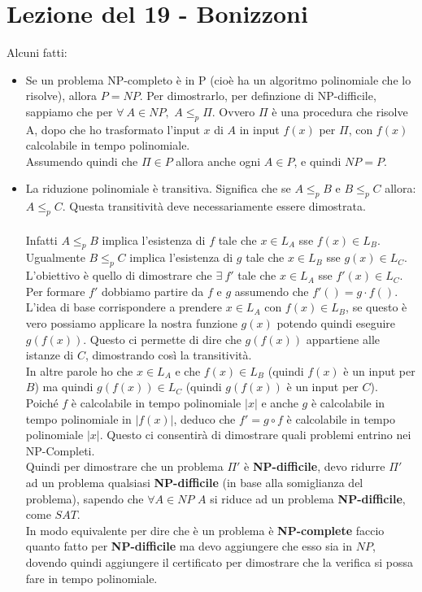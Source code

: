 \section{Lezione del 19 - Bonizzoni}
Alcuni fatti:
\begin{itemize}
    \item Se un problema NP-completo è in P (cioè ha un algoritmo polinomiale che lo risolve), allora $P = NP$.
    Per dimostrarlo, per definzione di NP-difficile, sappiamo che per $\forall \ A \in NP,\,\,A \leq_p \Pi$. Ovvero $\Pi$ è una procedura che risolve A, dopo che ho trasformato l'input $x$ di $A$ in input $f(x)$ per $\Pi$, con $f(x)$ calcolabile in tempo polinomiale.\\ Assumendo quindi che $\Pi\in P$ allora anche ogni $A\in P$, e quindi $NP=P$.
    \item La riduzione polinomiale è transitiva. Significa che se $A\leq_p B$ e $B\leq_p C$ allora: $A\leq_p C$. Questa transitività deve necessariamente essere dimostrata. \\ \\
    Infatti $A\leq_p B$ implica l'esistenza di $f$ tale che $x\in L_A$ sse $f(x) \in L_B$. Ugualmente $B\leq_p C$ implica l'esistenza di $g$ tale che $x\in L_B$ sse $g(x) \in L_C$.\\
    L'obiettivo è quello di dimostrare che $\exists \ f'$ tale che $x\in L_A$ sse $f'(x)\in  L_C$. Per formare $f'$ dobbiamo partire da $f$ e $g$ assumendo che $f'() = g \cdot f()$. L'idea di base corrispondere a prendere $x \in L_A$ con $f(x) \in L_B$, se questo è vero possiamo applicare la nostra funzione $g(x)$ potendo quindi eseguire $g(f(x))$. Questo ci permette di dire che $g(f(x))$ appartiene alle istanze di $C$, dimostrando così la transitività. \\
    In altre parole ho che $x \in L_A$ e che $f(x)\in L_B$ (quindi $f(x)$ è un input per $B$) ma quindi $g(f(x))\in L_C$ (quindi $g(f(x))$ è un input per $C$). \\
    Poiché $f$ è calcolabile in tempo polinomiale $|x|$ e anche $g$ è calcolabile in tempo polinomiale in $|f(x)|$, deduco che $f'=g\circ f$ è calcolabile in tempo polinomiale $|x|$. Questo ci consentirà di dimostrare quali problemi entrino nei NP-Completi. \\
    
    Quindi per dimostrare che un problema $\Pi'$ è \textbf{NP-difficile}, devo ridurre $\Pi'$ ad un problema qualsiasi \textbf{NP-difficile} (in base alla somiglianza del problema), sapendo che $\forall A\in NP$ $A$ si riduce ad un problema \textbf{NP-difficile}, come $SAT$.\\ In modo equivalente per dire che è un problema è \textbf{NP-complete} faccio quanto fatto per \textbf{NP-difficile} ma devo aggiungere che esso sia in $NP$, dovendo quindi aggiungere il certificato per dimostrare che la verifica si possa fare in tempo polinomiale.
\end{itemize}

